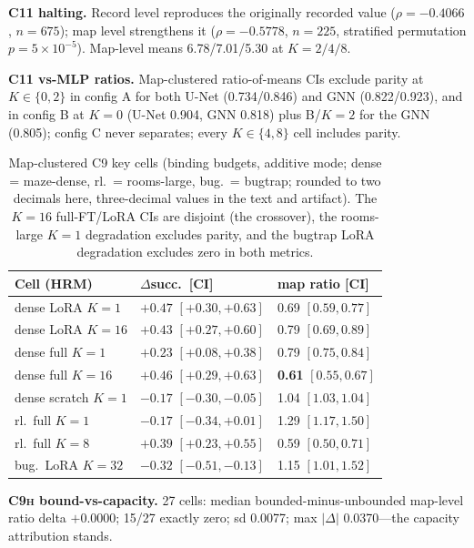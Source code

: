 \documentclass[letterpaper]{article} %
\newcommand{\stage}[1]{\textsc{#1}}
\begin{document}
\textbf{\stage{C11} halting.} Record level reproduces the originally recorded value ($\rho{=}-0.4066$, $n{=}675$); map level strengthens it ($\rho{=}-0.5778$, $n{=}225$, stratified permutation $p{=}5{\times}10^{-5}$). Map-level means 6.78/7.01/5.30 at $K{=}2/4/8$.

\textbf{\stage{C11} vs-MLP ratios.} Map-clustered ratio-of-means CIs exclude parity at $K\in\{0,2\}$ in config A for both U-Net (0.734/0.846) and GNN (0.822/0.923), and in config B at $K{=}0$ (U-Net 0.904, GNN 0.818) plus B/$K{=}2$ for the GNN (0.805); config C never separates; every $K\in\{4,8\}$ cell includes parity.

\begin{table}[t]
\centering
\small
\setlength{\tabcolsep}{1.5pt}
\begin{tabular}{@{}lll@{}}
\toprule
Cell (HRM) & $\Delta$succ.\ [CI] & map ratio [CI] \\
\midrule
dense LoRA $K{=}1$ & $+0.47$ $[+0.30,+0.63]$ & 0.69 $[0.59,0.77]$ \\
dense LoRA $K{=}16$ & $+0.43$ $[+0.27,+0.60]$ & 0.79 $[0.69,0.89]$ \\
dense full $K{=}1$ & $+0.23$ $[+0.08,+0.38]$ & 0.79 $[0.75,0.84]$ \\
dense full $K{=}16$ & $+0.46$ $[+0.29,+0.63]$ & \textbf{0.61} $[0.55,0.67]$ \\
dense scratch $K{=}1$ & $-0.17$ $[-0.30,-0.05]$ & 1.04 $[1.03,1.04]$ \\
rl.\ full $K{=}1$ & $-0.17$ $[-0.34,+0.01]$ & 1.29 $[1.17,1.50]$ \\
rl.\ full $K{=}8$ & $+0.39$ $[+0.23,+0.55]$ & 0.59 $[0.50,0.71]$ \\
bug.\ LoRA $K{=}32$ & $-0.32$ $[-0.51,-0.13]$ & 1.15 $[1.01,1.52]$ \\
\bottomrule
\end{tabular}
\caption{Map-clustered \stage{C9} key cells (binding budgets, additive mode; dense = maze-dense, rl.\ = rooms-large, bug.\ = bugtrap; rounded to two decimals here, three-decimal values in the text and artifact). The $K{=}16$ full-FT/LoRA CIs are disjoint (the crossover), the rooms-large $K{=}1$ degradation excludes parity, and the bugtrap LoRA degradation excludes zero in both metrics.}
\label{tab:wcr-c9}
\end{table}

\textbf{\stage{C9h} bound-vs-capacity.} 27 cells: median bounded-minus-unbounded map-level ratio delta $+0.0000$; 15/27 exactly zero; sd 0.0077; max $|\Delta|$ 0.0370---the capacity attribution stands.
\end{document}
